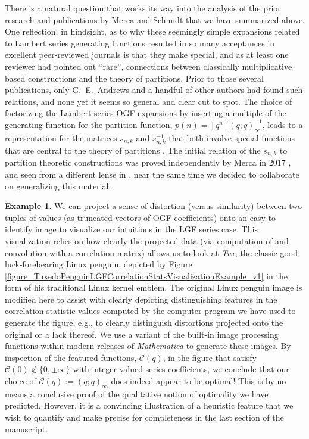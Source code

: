 \documentclass[12pt,reqno,a4letter]{article}
\numberwithin{figure}{section}
\numberwithin{table}{section}
\numberwithin{equation}{section}
\theoremstyle{plain}
\numberwithin{theorem}{section}
\theoremstyle{definition}
\newtheorem{example}[theorem]{Example}
\begin{document}
There is a natural question that works its way into the analysis of the prior research and 
publications by Merca and Schmidt that we have summarized above. 
One reflection, in hindsight, as to why these seemingly simple expansions related to Lambert 
series generating functions resulted in so many acceptances in excellent peer-reviewed journals 
is that they make special, and as at least one reviewer had pointed out ``rare'', connections 
between classically multiplicative based constructions and the theory of partitions. 
Prior to those several publications, only G.~E.~Andrews and a handful of other authors 
had found such relations, and none yet it seems so general and clear cut to spot. 
The choice of factorizing the Lambert series OGF expansions by inserting a multiple of the 
generating function for the partition function, $p(n) = [q^n] (q; q)_{\infty}^{-1}$, 
leads to a representation for the matrices $s_{n,k}$ and $s_{n,k}^{-1}$ that both 
involve special functions that are central to 
the theory of partitions \cite{ANDREWS}. The initial relation of the 
$s_{n,k}$ to partition theoretic constructions was proved independently by Merca in 2017 
\cite{MERCA-LSFACTTHM}, and seen from a different lense in \cite{AA}, 
near the same time we decided to collaborate on generalizing this material. 

\begin{example}
We can project a sense of distortion (versus similarity) between two 
tuples of values (as truncated vectors of OGF coefficients) onto an easy to identify image 
to visualize our intuitions in the LGF series case. 
This visualization relies on how clearly the 
projected data (via computation of and convolution with a correlation matrix) 
allows us to look at \emph{Tux}, the classic 
good-luck-forebearing Linux penguin, depicted by 
Figure \ref{figure_TuxedoPenguinLGFCorrelationStatsVisualizationExample_v1} 
in the form of his traditional Linux kernel emblem. 
The original Linux penguin image is modified here to assist with clearly depicting
distinguishing features in the correlation statistic values computed by the computer program 
we have used to generate the figure, e.g., to clearly distinguish distortions projected onto 
the original or a lack thereof. 
We use a variant of the built-in image processing functions within modern 
releases of \emph{Mathematica} to generate these images. 
By inspection of the featured functions, $\mathcal{C}(q)$, in the figure that satisfy 
$\mathcal{C}(0) \notin \{0, \pm \infty\}$ with integer-valued series coefficients, 
we conclude that our choice of 
$\mathcal{C}(q) := (q; q)_{\infty}$ does indeed appear to be optimal! 
This is by no means a conclusive proof of the qualitative notion of optimality we have predicted. 
However, it is a convincing 
illustration of a heuristic feature that we wish to 
quantify and make precise for completeness in the last section of the manuscript.
\end{example}
\end{document}
